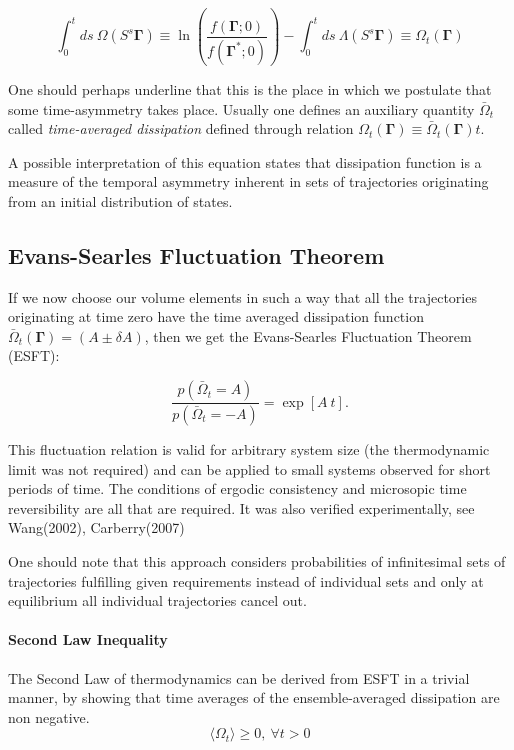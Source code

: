\documentclass[a4paper,12pt]{article}
\begin{document}
\begin{equation}
  \label{Dissipation}
  \int_0^t ds\ \Omega(S^s \bm{\Gamma})\equiv \ln(\frac{f(\bm{\Gamma};0)}{f(\bm{\Gamma}^*;0)}) -\int_0^t ds \ \Lambda(S^s \bm{\Gamma}) \equiv \Omega_t(\bm{\Gamma})
\end{equation}

One should perhaps underline that this is the place in which we postulate that some time-asymmetry takes place.
Usually one defines an auxiliary quantity $\bar{\Omega}_t$ called \textit{time-averaged dissipation} defined through relation $\Omega_t(\bm{\Gamma}) \equiv \bar{\Omega}_t(\bm{\Gamma})t$.

A possible interpretation of this equation states that dissipation function is a measure of the temporal asymmetry inherent in sets of trajectories originating from an initial distribution of states.

\subsection{Evans-Searles Fluctuation Theorem}

If we now choose our volume elements in such a way that all the trajectories originating at time zero have the time averaged dissipation function $\bar{\Omega}_t(\bm{\Gamma})=(A \pm \delta A)$, then we get the Evans-Searles Fluctuation Theorem (ESFT):

\begin{equation}
\label{ESFT}
  \frac{p(\bar{\Omega}_t=A)}{p(\bar{\Omega}_t=-A)}=\exp[A\ t].
\end{equation}

This fluctuation relation is valid for arbitrary system size (the thermodynamic limit was not required) and can be applied to small systems observed for short periods of time. The conditions of ergodic consistency and microsopic time reversibility are all that are required.
It was also verified experimentally, see Wang(2002)\cite{Wang:2002hw}, Carberry(2007)\cite{Carberry:2007be}

One should note that this approach considers probabilities of infinitesimal sets of trajectories fulfilling given requirements instead of individual sets and only at equilibrium all individual trajectories cancel out.

\paragraph{Second Law Inequality}
The Second Law of thermodynamics can be derived from ESFT in a trivial manner, by showing that time averages of the ensemble-averaged dissipation are non negative.
\begin{equation}
  \langle\Omega_t\rangle\geq 0,\  \forall t > 0
\end{equation}
\end{document}
